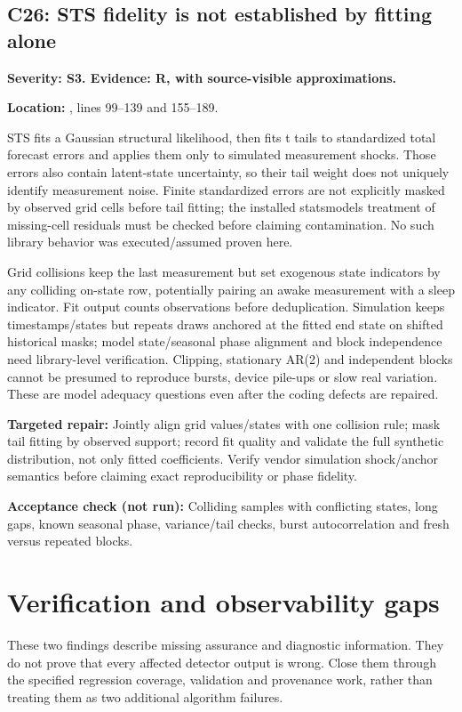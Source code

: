 \documentclass[11pt,a4paper]{article}
\newcommand{\code}[1]{\texttt{\detokenize{#1}}}
\newcommand{\loc}[2]{\par\textbf{Location:} \code{#1}, lines #2.\par}
\newcommand{\finding}[4]{\subsection{#1: #4}\label{issue:#1}\textbf{Severity: #2. Evidence: #3.}\par}
\newcommand{\repair}{\par\textbf{Targeted repair:} }
\newcommand{\checklater}{\par\textbf{Acceptance check (not run):} }
\begin{document}
\finding{C26}{S3}{R, with source-visible approximations}{STS fidelity is not established by fitting alone}
\loc{wearable/cpd/_sts.py}{99--139 and 155--189}
STS fits a Gaussian structural likelihood, then fits t tails to standardized total
forecast errors and applies them only to simulated measurement shocks. Those errors
also contain latent-state uncertainty, so their tail weight does not uniquely
identify measurement noise. Finite standardized errors are not explicitly masked
by observed grid cells before tail fitting; the installed statsmodels treatment of
missing-cell residuals must be checked before claiming contamination. No such
library behavior was executed/assumed proven here.

Grid collisions keep the last measurement but set exogenous state indicators by
any colliding on-state row, potentially pairing an awake measurement with a sleep
indicator. Fit output counts observations before deduplication. Simulation keeps
timestamps/states but repeats draws anchored at the fitted end state on shifted
historical masks; model state/seasonal phase alignment and block independence need
library-level verification. Clipping, stationary AR(2) and independent blocks cannot
be presumed to reproduce bursts, device pile-ups or slow real variation. These are
model adequacy questions even after the coding defects are repaired.
\repair Jointly align grid values/states with one collision rule; mask tail fitting
by observed support; record fit quality and validate the full synthetic distribution,
not only fitted coefficients. Verify vendor simulation shock/anchor semantics before
claiming exact reproducibility or phase fidelity.
\checklater Colliding samples with conflicting states, long gaps, known seasonal
phase, variance/tail checks, burst autocorrelation and fresh versus repeated blocks.

\section{Verification and observability gaps}

These two findings describe missing assurance and diagnostic information. They do not prove that every affected detector output is wrong. Close them through the specified regression coverage, validation and provenance work, rather than treating them as two additional algorithm failures.
\end{document}
